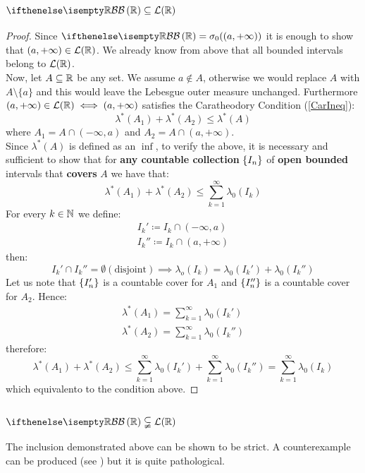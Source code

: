 \subsection{\texorpdfstring{$\B[\R] \subseteq \Leb(\R)$}{B(R) is included in L(R)}}
\begin{proof}
    Since $\B[\R]=\sigma_0((a,+\infty))$ it is enough to show that $(a,+\infty)\in\mathcal{L}(\mathbb{R})$. We already know from above that all bounded intervals belong to $\mathcal{L}(\mathbb{R})$. \\
    Now, let $A\subseteq\mathbb{R}$ be any set. We assume $a\notin A$, otherwise we would replace $A$ with $A\setminus\{a\}$ and this would leave the Lebesgue outer measure unchanged. Furthermore $(a,+\infty)\in\mathcal{L}(\mathbb{R}) \iff (a,+\infty)$ satisfies the Caratheodory Condition (\ref{CarIneq}):
    \[
        \lambda^*(A_1)+\lambda^*(A_2)\leq\lambda^*(A) \label{a}
    \]
    where $A_1 = A\cap (-\infty,a)$ and $A_2 = A \cap (a,+\infty)$.\\
    Since $\lambda^*(A)$ is defined as an $\inf$, to verify the above, it is necessary and sufficient to show that for \textbf{any countable collection} $\{ I_n \}$ of \textbf{open bounded} intervals that \textbf{covers} $A$ we have that:
    \[
        \lambda^*(A_1)+\lambda^*(A_2)\leq \sum_{k=1}^{\infty} \lambda_0(I_k)
    \]
    For every $k\in\mathbb{N}$ we define:
    \begin{align*}
        I_k' \coloneqq I_k \cap (-\infty, a)\\
        I_k'' \coloneqq I_k \cap (a,+\infty)
    \end{align*}
    then:
    \[
        I_k' \cap I_k'' = \emptyset (\text{disjoint}) \implies \lambda_o(I_k) = \lambda_0(I_k') + \lambda_0 (I_k'')
    \]
    Let us note that $\{ I'_n \}$ is a countable cover for $A_1$ and $\{ I''_n \}$ is a countable cover for $A_2$.
    Hence:
    \begin{align*}
        \lambda^*(A_1)=\sum_{k=1}^{\infty} \lambda_0(I_k') \\
        \lambda^*(A_2)=\sum_{k=1}^{\infty} \lambda_0(I_k'')
    \end{align*}
    therefore:
    \[
        \lambda^*(A_1)+\lambda^*(A_2)\leq \sum_{k=1}^{\infty} \lambda_0(I_k') + \sum_{k=1}^{\infty} \lambda_0(I_k'') = \sum_{k=1}^{\infty} \lambda_0(I_k)
    \]
    which equivalento to the condition above.
\end{proof}

\subsection{\texorpdfstring{$\B[\R] \subsetneqq \Leb(\R)$}{B(R) is strictly included in L(R)}}
The inclusion demonstrated above can be shown to be strict. A counterexample can be produced (see \href{https://math.stackexchange.com/questions/141017/lebesgue-measurable-set-that-is-not-a-borel-measurable-set}{\color{blue}{here}}) but it is quite pathological.

